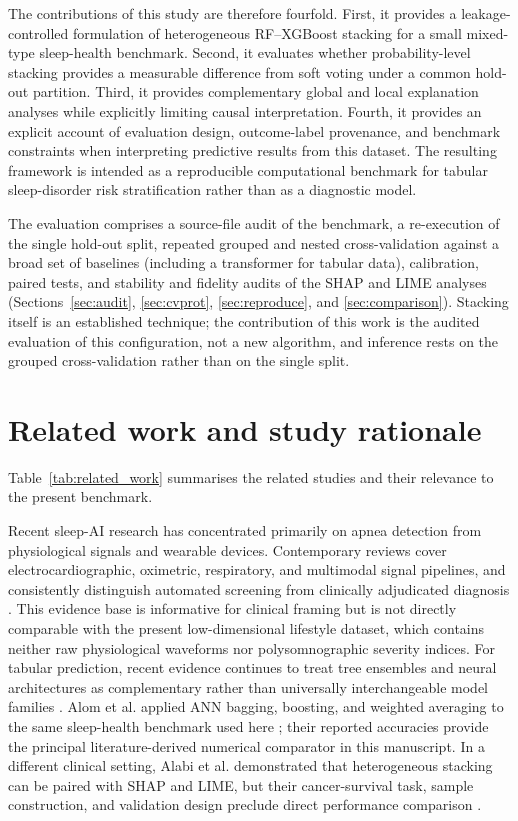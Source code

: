 \documentclass[a4paper,fleqn]{cas-dc}
\begin{document}
The contributions of this study are therefore fourfold. First, it provides a leakage-controlled formulation of heterogeneous RF--XGBoost stacking for a small mixed-type sleep-health benchmark. Second, it evaluates whether probability-level stacking provides a measurable difference from soft voting under a common hold-out partition. Third, it provides complementary global and local explanation analyses while explicitly limiting causal interpretation. Fourth, it provides an explicit account of evaluation design, outcome-label provenance, and benchmark constraints when interpreting predictive results from this dataset. The resulting framework is intended as a reproducible computational benchmark for tabular sleep-disorder risk stratification rather than as a diagnostic model.

The evaluation comprises a source-file audit of the benchmark, a re-execution of the single hold-out split, repeated grouped and nested cross-validation against a broad set of baselines (including a transformer for tabular data), calibration, paired tests, and stability and fidelity audits of the SHAP and LIME analyses (Sections~\ref{sec:audit}, \ref{sec:cvprot}, \ref{sec:reproduce}, and \ref{sec:comparison}). Stacking itself is an established technique; the contribution of this work is the audited evaluation of this configuration, not a new algorithm, and inference rests on the grouped cross-validation rather than on the single split.

\section{Related work and study rationale}

Table~\ref{tab:related_work} summarises the related studies and their relevance to the present benchmark.

Recent sleep-AI research has concentrated primarily on apnea detection from physiological signals and wearable devices. Contemporary reviews cover electrocardiographic, oximetric, respiratory, and multimodal signal pipelines, and consistently distinguish automated screening from clinically adjudicated diagnosis \cite{bazoukis2023,tyagi2023,abdalrazaq2024,giorgi2025}. This evidence base is informative for clinical framing but is not directly comparable with the present low-dimensional lifestyle dataset, which contains neither raw physiological waveforms nor polysomnographic severity indices. For tabular prediction, recent evidence continues to treat tree ensembles and neural architectures as complementary rather than universally interchangeable model families \cite{borisov2024}. Alom et al. applied ANN bagging, boosting, and weighted averaging to the same sleep-health benchmark used here \cite{alom2024}; their reported accuracies provide the principal literature-derived numerical comparator in this manuscript. In a different clinical setting, Alabi et al. demonstrated that heterogeneous stacking can be paired with SHAP and LIME, but their cancer-survival task, sample construction, and validation design preclude direct performance comparison \cite{alabi2023}.
\end{document}
